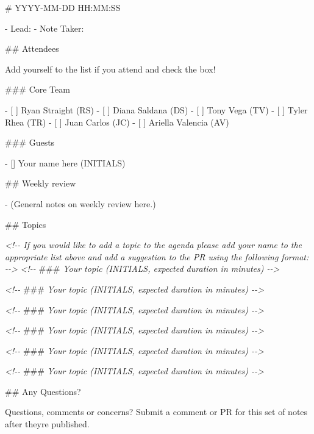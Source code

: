 \documentclass[
]{book}
\newenvironment{Shaded}{\begin{snugshade}}{\end{snugshade}}
\newcommand{\AlertTok}[1]{\textcolor[rgb]{0.94,0.16,0.16}{#1}}
\newcommand{\CommentTok}[1]{\textcolor[rgb]{0.56,0.35,0.01}{\textit{#1}}}
\newcommand{\FunctionTok}[1]{\textcolor[rgb]{0.00,0.00,0.00}{#1}}
\newcommand{\NormalTok}[1]{#1}
\newcommand{\SpecialStringTok}[1]{\textcolor[rgb]{0.31,0.60,0.02}{#1}}
\newcommand{\VariableTok}[1]{\textcolor[rgb]{0.00,0.00,0.00}{#1}}
\begin{document}
\begin{Shaded}
\begin{Highlighting}[]
\FunctionTok{\# YYYY{-}MM{-}DD HH:MM:SS}

\SpecialStringTok{{-} }\NormalTok{Lead:}
\SpecialStringTok{{-} }\NormalTok{Note Taker: }

\FunctionTok{\#\# Attendees}

\NormalTok{Add yourself to the list if you attend and check the box!}

\FunctionTok{\#\#\# Core Team}

\SpecialStringTok{{-} }\VariableTok{[ ]}\NormalTok{ Ryan Straight (RS)}
\SpecialStringTok{{-} }\VariableTok{[ ]}\NormalTok{ Diana Saldana (DS)}
\SpecialStringTok{{-} }\VariableTok{[ ]}\NormalTok{ Tony Vega (TV)}
\SpecialStringTok{{-} }\VariableTok{[ ]}\NormalTok{ Tyler Rhea (TR)}
\SpecialStringTok{{-} }\VariableTok{[ ]}\NormalTok{ Juan Carlos (JC)}
\SpecialStringTok{{-} }\VariableTok{[ ]}\NormalTok{ Ariella Valencia (AV)}

\FunctionTok{\#\#\# Guests}

\SpecialStringTok{{-} }\NormalTok{[] Your name here (INITIALS)}

\FunctionTok{\#\# Weekly review}

\SpecialStringTok{{-} }\NormalTok{(General notes on weekly review here.)}

\FunctionTok{\#\# Topics}

\CommentTok{\textless{}!{-}{-} If you would like to add a topic to the agenda please add your name to the appropriate list above and add a suggestion to the PR using the following format: {-}{-}\textgreater{}}
\CommentTok{\textless{}!{-}{-} }\AlertTok{\#\#\#}\CommentTok{ Your topic (INITIALS, expected duration in minutes) {-}{-}\textgreater{}}

\CommentTok{\textless{}!{-}{-} }\AlertTok{\#\#\#}\CommentTok{ Your topic (INITIALS, expected duration in minutes) {-}{-}\textgreater{}}

\CommentTok{\textless{}!{-}{-} }\AlertTok{\#\#\#}\CommentTok{ Your topic (INITIALS, expected duration in minutes) {-}{-}\textgreater{}}

\CommentTok{\textless{}!{-}{-} }\AlertTok{\#\#\#}\CommentTok{ Your topic (INITIALS, expected duration in minutes) {-}{-}\textgreater{}}

\CommentTok{\textless{}!{-}{-} }\AlertTok{\#\#\#}\CommentTok{ Your topic (INITIALS, expected duration in minutes) {-}{-}\textgreater{}}

\CommentTok{\textless{}!{-}{-} }\AlertTok{\#\#\#}\CommentTok{ Your topic (INITIALS, expected duration in minutes) {-}{-}\textgreater{}}

\FunctionTok{\#\# Any Questions?}

\NormalTok{Questions, comments or concerns? Submit a comment or PR for this set of notes after they\textquotesingle{}re published.}
\end{Highlighting}
\end{Shaded}
\end{document}
